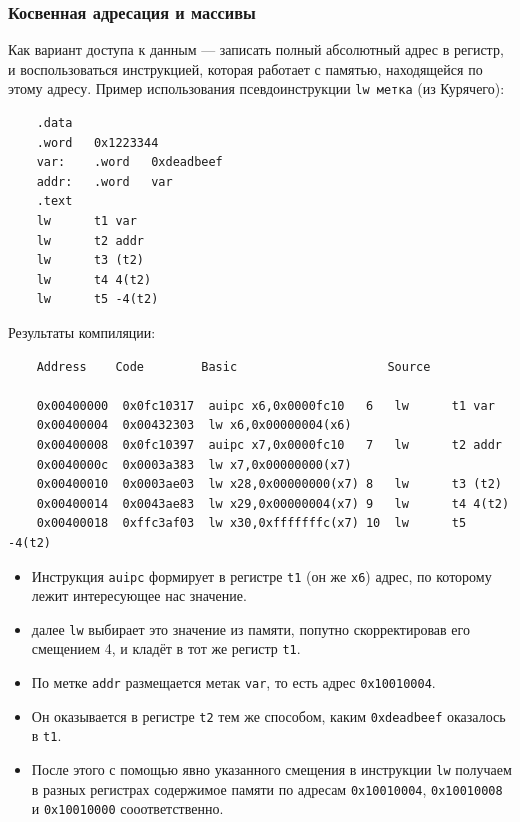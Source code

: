 \subsubsection{Косвенная адресация и массивы}

Как вариант доступа к данным --- записать полный абсолютный адрес в регистр, и воспользоваться инструкцией, которая работает с памятью, находящейся по этому адресу. Пример использования псевдоинструкции \verb|lw метка| (из Курячего):
\begin{verbatim}
    .data
    .word   0x1223344
    var:    .word   0xdeadbeef
    addr:   .word   var
    .text
    lw      t1 var
    lw      t2 addr
    lw      t3 (t2)
    lw      t4 4(t2)
    lw      t5 -4(t2)
\end{verbatim}

Результаты компиляции:
\begin{verbatim}
    Address    Code        Basic                     Source

    0x00400000  0x0fc10317  auipc x6,0x0000fc10   6   lw      t1 var
    0x00400004  0x00432303  lw x6,0x00000004(x6)
    0x00400008  0x0fc10397  auipc x7,0x0000fc10   7   lw      t2 addr
    0x0040000c  0x0003a383  lw x7,0x00000000(x7)
    0x00400010  0x0003ae03  lw x28,0x00000000(x7) 8   lw      t3 (t2)
    0x00400014  0x0043ae83  lw x29,0x00000004(x7) 9   lw      t4 4(t2)
    0x00400018  0xffc3af03  lw x30,0xfffffffc(x7) 10  lw      t5 -4(t2)
\end{verbatim}
\begin{itemize}
    \item Инструкция \verb|auipc| формирует в регистре \verb|t1| (он же \verb|x6|) адрес, по которому лежит интересующее нас значение.
    \item далее \verb|lw| выбирает это значение из памяти, попутно скорректировав его смещением 4, и кладёт в тот же регистр \verb|t1|.
    \item По метке \verb|addr| размещается метак \verb|var|, то есть адрес \verb|0x10010004|.
    \item Он оказывается в регистре \verb|t2| тем же способом, каким \verb|0xdeadbeef| оказалось в \verb|t1|.
    \item После этого с помощью явно указанного смещения в инструкции \verb|lw| получаем в разных регистрах содержимое памяти по адресам \verb|0x10010004|, \verb|0x10010008| и \verb|0x10010000| сооответственно.
\end{itemize}

